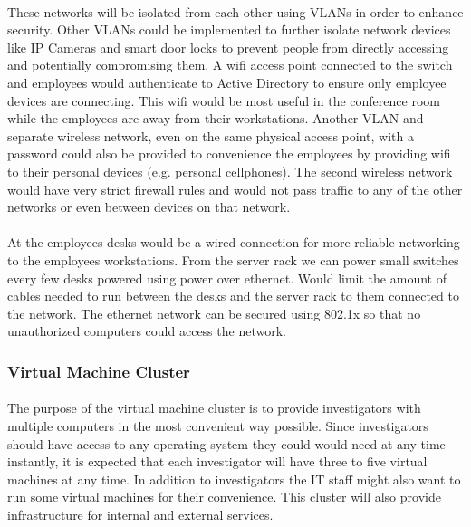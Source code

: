 \documentclass{article}
\begin{document}
\paragraph{}
These networks will be isolated from each other using VLANs in order to enhance security.
Other VLANs could be implemented to further isolate network devices like IP Cameras and smart door locks to prevent people from directly accessing and potentially compromising them.
A wifi access point connected to the switch and employees would authenticate to Active Directory to ensure only employee devices are connecting.
This wifi would be most useful in the conference room while the employees are away from their workstations.
Another VLAN and separate wireless network, even on the same physical access point, with a password could also be provided to convenience the employees by providing wifi to their personal devices (e.g. personal cellphones).
The second wireless network would have very strict firewall rules and would not pass traffic to any of the other networks or even between devices on that network.
\paragraph{}
At the employees desks would be a wired connection for more reliable networking to the employees workstations. 
From the server rack we can power small switches every few desks powered using power over ethernet.
Would limit the amount of cables needed to run between the desks and the server rack to them connected to the network.
The ethernet network can be secured using 802.1x so that no unauthorized computers could access the network. 

\subsubsection{Virtual Machine Cluster}
\paragraph{}
The purpose of the virtual machine cluster is to provide investigators with multiple computers in the most convenient way possible.
Since investigators should have access to any operating system they could would need at any time instantly, it is expected that each investigator will have three to five virtual machines at any time.
In addition to investigators the IT staff might also want to run some virtual machines for their convenience.
This cluster will also provide infrastructure for internal and external services.
\end{document}
